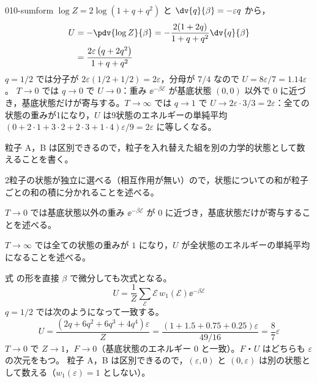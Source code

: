 \documentclass[uplatex,dvipdfmx,a4paper,11pt]{jsarticle}
\begin{document}
\begin{kaisetsu}{010-sumform}
 $\log Z=2\log(1+q+q^{2})$ と $\dv{q}{\beta}=-\varepsilon q$ から，
\begin{align*}
U&=-\pdv{\log Z}{\beta}=-\frac{2(1+2q)}{1+q+q^{2}}\dv{q}{\beta}\\
&=\frac{2\varepsilon\left(q+2q^{2}\right)}{1+q+q^{2}}
\end{align*}
$q=1/2$ では分子が $2\varepsilon(1/2+1/2)=2\varepsilon$，分母が $7/4$ なので $U=8\varepsilon/7=\num{1.14}\varepsilon$。
$T\to0$ では $q\to0$ で $U\to0$：重み $\ee^{-\beta\mathcal{E}}$ が基底状態 $(0,0)$ 以外で 0 に近づき，基底状態だけが寄与する。$T\to\infty$ では $q\to1$ で $U\to2\varepsilon\cdot3/3=2\varepsilon$：全ての状態の重みが1になり，$U$ は9状態のエネルギーの単純平均 $(0+2\cdot1+3\cdot2+2\cdot3+1\cdot4)\varepsilon/9=2\varepsilon$ に等しくなる。
\begin{ronten}
  \item {} 粒子 A，B は区別できるので，粒子を入れ替えた組を別の力学的状態として数えることを書く。
  \item {} 2粒子の状態が独立に選べる（相互作用が無い）ので，状態についての和が粒子ごとの和の積に分かれることを述べる。
  \item {} $T\to0$ では基底状態以外の重み $\ee^{-\beta\mathcal{E}}$ が $0$ に近づき，基底状態だけが寄与することを述べる。
  \item {} $T\to\infty$ では全ての状態の重みが $1$ になり，$U$ が全状態のエネルギーの単純平均になることを述べる。
\end{ronten}
\kenzan 式 の形を直接 $\beta$ で微分しても次式となる。
\[U=\frac{1}{Z}\sum_{\mathcal{E}}\mathcal{E}\,w_{1}(\mathcal{E})\ee^{-\beta\mathcal{E}}\]
$q=1/2$ では次のようになって一致する。
\[U=\frac{(2q+6q^{2}+6q^{3}+4q^{4})\varepsilon}{Z}=\frac{(1+\num{1.5}+\num{0.75}+\num{0.25})\varepsilon}{49/16}=\frac{8}{7}\varepsilon\]
$T\to0$ で $Z\to1$，$F\to0$（基底状態のエネルギー 0 と一致）。$F$・$U$ はどちらも $\varepsilon$ の次元をもつ。
\tsumazuki 粒子 A，B は区別できるので，$(\varepsilon,0)$ と $(0,\varepsilon)$ は別の状態として数える（$w_{1}(\varepsilon)=1$ としない）。
\end{kaisetsu}
\end{document}
